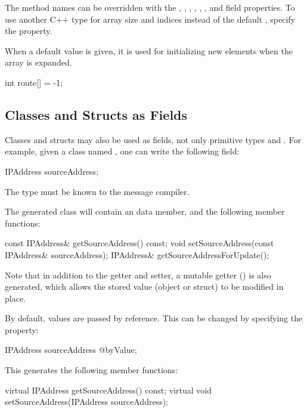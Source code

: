 The method names can be overridden with the , ,
, , , ,
and  field properties. To use another C++ type for array size and
indices instead of the default , specify the 
property.

When a default value is given, it is used for initializing new elements when the array is expanded.

\begin{msg}
int route[] = -1;
\end{msg}


\subsection{Classes and Structs as Fields}
\label{sec:msg-defs:other-types-as-fields}

Classes and structs may also be used as fields, not only primitive types and
. For example, given a class named , one can write
the following field:

\begin{msg}
IPAddress sourceAddress;
\end{msg}

The  type must be known to the message compiler.

The generated class will contain an  data member, and the
following member functions:

\begin{cpp}
const IPAddress& getSourceAddress() const;
void setSourceAddress(const IPAddress& sourceAddress);
IPAddress& getSourceAddressForUpdate();
\end{cpp}

Note that in addition to the getter and setter, a mutable getter
() is also generated, which allows the stored value (object
or struct) to be modified in place.

By default, values are passed by reference. This can be changed by specifying
the  property:

\begin{msg}
IPAddress sourceAddress @byValue;
\end{msg}

This generates the following member functions:

\begin{cpp}
virtual IPAddress getSourceAddress() const;
virtual void setSourceAddress(IPAddress sourceAddress);
\end{cpp}

